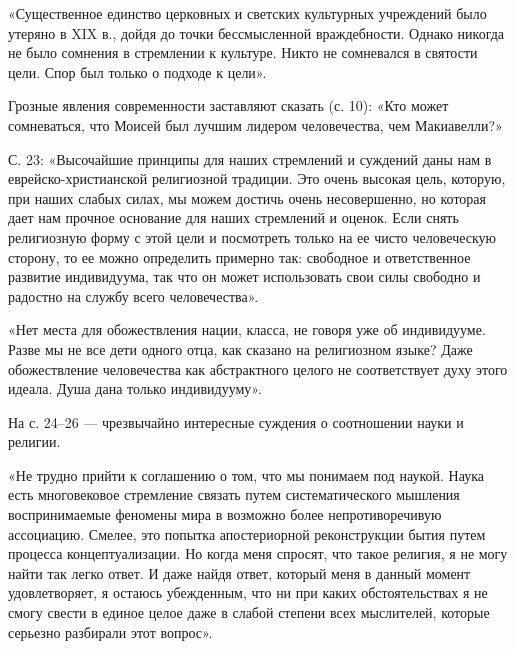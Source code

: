 «Существенное единство церковных и светских культурных учреждений было
утеряно в  XIX в., дойдя  до точки бессмысленной  враждебности. Однако
никогда не было сомнения в  стремлении к культуре. Никто не сомневался
в святости цели. Спор был только о подходе к цели».

Грозные  явления  современности  заставляют   сказать  (с.  10):  «Кто
может  сомневаться, что  Моисей был  лучшим лидером  человечества, чем
Макиавелли?»

С. 23: «Высочайшие принципы для наших стремлений и суждений даны нам в
еврейско-христианской  религиозной традиции.  Это очень  высокая цель,
которую, при наших слабых силах,  мы можем достичь очень несовершенно,
но которая дает  нам прочное основание для наших  стремлений и оценок.
Если  снять религиозную  форму  с  этой цели  и  посмотреть только  на
ее  чисто  человеческую  сторону,  то  ее  можно  определить  примерно
так:  свободное  и  ответственное  развитие индивидуума,  так  что  он
может  использовать свои  силы  свободно и  радостно  на службу  всего
человечества».

«Нет  места  для  обожествления  нации,   класса,  не  говоря  уже  об
индивидууме.  Разве  мы  не  все  дети одного  отца,  как  сказано  на
религиозном  языке? Даже  обожествление человечества  как абстрактного
целого  не   соответствует  духу   этого  идеала.  Душа   дана  только
индивидууму».

На с. 24--26 --- чрезвычайно интересные суждения о соотношении науки и
религии.

«Не   трудно   прийти   к   соглашению  о   том,   что   мы   понимаем
под  наукой.   Наука  есть   многовековое  стремление   связать  путем
систематического  мышления  воспринимаемые  феномены мира  в  возможно
более непротиворечивую  ассоциацию. Смелее, это  попытка апостериорной
реконструкции  бытия путем  процесса концептуализации.  Но когда  меня
спросят, что  такое религия, я не  могу найти так легко  ответ. И даже
найдя ответ,  который меня  в данный  момент удовлетворяет,  я остаюсь
убежденным,  что ни  при каких  обстоятельствах  я не  смогу свести  в
единое целое даже  в слабой степени всех  мыслителей, которые серьезно
разбирали этот вопрос».


